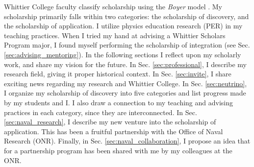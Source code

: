 \documentclass[../../main.tex]{subfiles}
\begin{document}
\label{sec:scholarship}

Whittier College faculty classify scholarship using the \textit{Boyer} model \cite{boyer}.  My scholarship primarily falls within two categories: the scholarship of discovery, and the scholarship of application.  I utilize physics education research (PER) in my teaching practices.  When I tried my hand at advising a Whittier Scholars Program major, I found myself performing the scholarship of integration (see Sec. \ref{sec:advising_mentoring}).  In the following sections I reflect upon my scholarly work, and share my vision for the future.  In Sec. \ref{sec:professional}, I describe my research field, giving it proper historical context.  In Sec. \ref{sec:invite}, I share exciting news regarding my research and Whittier College.  In Sec. \ref{sec:neutrino}, I organize my scholarship of discovery into five categories and list progress made by my students and I.  I also draw a connection to my teaching and advising practices in each category, since they are interconnected.  In Sec. \ref{sec:naval_research}, I describe my new venture into the scholarship of application.  This has been a fruitful partnership with the Office of Naval Research (ONR).  Finally, in Sec. \ref{sec:naval_collaboration}, I propose an idea that for a partnership program has been shared with me by my colleagues at the ONR.

%

\begin{flushleft}

\end{flushleft}

%

\begin{flushleft}

\end{flushleft}

%

\begin{flushleft}

\end{flushleft}
\end{document}
